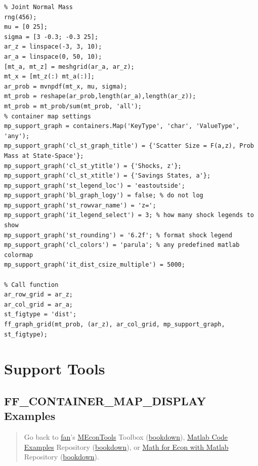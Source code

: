 \documentclass[
]{book}
\begin{document}
\begin{verbatim}
% Joint Normal Mass
rng(456);
mu = [0 25];
sigma = [3 -0.3; -0.3 25];
ar_z = linspace(-3, 3, 10);
ar_a = linspace(0, 50, 10);
[mt_a, mt_z] = meshgrid(ar_a, ar_z);
mt_x = [mt_z(:) mt_a(:)];
ar_prob = mvnpdf(mt_x, mu, sigma);
mt_prob = reshape(ar_prob,length(ar_a),length(ar_z));
mt_prob = mt_prob/sum(mt_prob, 'all');
% container map settings
mp_support_graph = containers.Map('KeyType', 'char', 'ValueType', 'any');
mp_support_graph('cl_st_graph_title') = {'Scatter Size = F(a,z), Prob Mass at State-Space'};
mp_support_graph('cl_st_ytitle') = {'Shocks, z'};
mp_support_graph('cl_st_xtitle') = {'Savings States, a'};
mp_support_graph('st_legend_loc') = 'eastoutside';
mp_support_graph('bl_graph_logy') = false; % do not log
mp_support_graph('st_rowvar_name') = 'z=';
mp_support_graph('it_legend_select') = 3; % how many shock legends to show
mp_support_graph('st_rounding') = '6.2f'; % format shock legend
mp_support_graph('cl_colors') = 'parula'; % any predefined matlab colormap
mp_support_graph('it_dist_csize_multiple') = 5000;

% Call function
ar_row_grid = ar_z;
ar_col_grid = ar_a;
st_figtype = 'dist';
ff_graph_grid(mt_prob, (ar_z), ar_col_grid, mp_support_graph, st_figtype);
\end{verbatim}

\hypertarget{support-tools}{%
\chapter{Support Tools}\label{support-tools}}

\hypertarget{ff_container_map_display-examples}{%
\section{FF\_CONTAINER\_MAP\_DISPLAY Examples}\label{ff_container_map_display-examples}}

\begin{quote}
Go back to \href{http://fanwangecon.github.io/}{fan}'s \href{https://fanwangecon.github.io/MEconTools/}{MEconTools} Toolbox (\href{https://fanwangecon.github.io/MEconTools/bookdown}{bookdown}), \href{https://fanwangecon.github.io/M4Econ/}{Matlab Code Examples} Repository (\href{https://fanwangecon.github.io/M4Econ/bookdown}{bookdown}), or \href{https://fanwangecon.github.io/Math4Econ/}{Math for Econ with Matlab} Repository (\href{https://fanwangecon.github.io/Math4Econ/bookdown}{bookdown}).
\end{quote}
\end{document}
